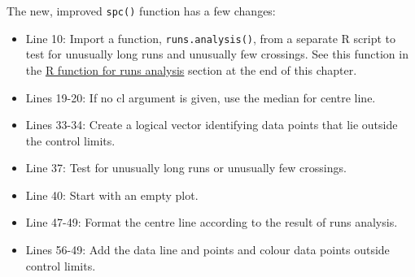 \documentclass[
]{book}
\begin{document}
The new, improved \texttt{spc()} function has a few changes:

\begin{itemize}
\item
  Line 10: Import a function, \texttt{runs.analysis()}, from a separate R script to test for unusually long runs and unusually few crossings. See this function in the \hyperref[r-function-for-runs-analysis]{R function for runs analysis} section at the end of this chapter.
\item
  Lines 19-20: If no cl argument is given, use the median for centre line.
\item
  Lines 33-34: Create a logical vector identifying data points that lie outside the control limits.
\item
  Line 37: Test for unusually long runs or unusually few crossings.
\item
  Line 40: Start with an empty plot.
\item
  Line 47-49: Format the centre line according to the result of runs analysis.
\item
  Lines 56-49: Add the data line and points and colour data points outside control limits.
\end{itemize}
\end{document}
